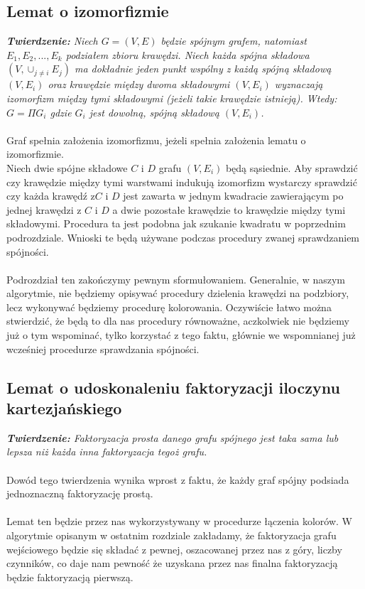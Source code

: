 \documentclass[12pt,a4paper,titlepage]{article}
\begin{document}
\subsection{Lemat o izomorfizmie}
\textit{\textbf{Twierdzenie: }Niech $G=(V, E)$ będzie spójnym grafem, natomiast $E_1 , E_2 , ... , E_k$ podziałem zbioru krawędzi. Niech każda spójna składowa $(V, \cup_{j \neq i}E_j)$ ma dokładnie jeden punkt wspólny z każdą spójną składową $(V, E_i)$ oraz krawędzie między dwoma składowymi $(V, E_i)$ wyznaczają izomorfizm między tymi składowymi (jeżeli takie krawędzie istnieją). Wtedy: $G=\Pi G_i $ gdzie $G_i $ jest dowolną, spójną składową $(V, E_i)$.}\\
\\
Graf spełnia założenia izomorfizmu, jeżeli spełnia założenia lematu o izomorfizmie. \\
Niech dwie spójne składowe $C$ i $D$ grafu $(V, E_i)$ będą sąsiednie. Aby sprawdzić czy krawędzie między tymi warstwami indukują izomorfizm wystarczy sprawdzić czy każda krawędź z$C$ i $D$ jest zawarta w jednym kwadracie zawierającym po jednej krawędzi z $C$ i $D$ a dwie pozostałe krawędzie to krawędzie między tymi składowymi. Procedura ta jest podobna jak szukanie kwadratu w poprzednim podrozdziale. Wnioski te będą używane podczas procedury zwanej sprawdzaniem spójności.\\
\\
Podrozdział ten zakończymy pewnym sformułowaniem. Generalnie, w naszym algorytmie, nie będziemy opisywać procedury dzielenia krawędzi na podzbiory, lecz wykonywać będziemy procedurę kolorowania. Oczywiście łatwo można stwierdzić, że będą to dla nas procedury równoważne, aczkolwiek nie będziemy już o tym wspominać, tylko korzystać z tego faktu, głównie we wspomnianej już wcześniej procedurze sprawdzania spójności.\\ 
\subsection{Lemat o udoskonaleniu faktoryzacji iloczynu kartezjańskiego}
\textit{\textbf{Twierdzenie:} Faktoryzacja prosta danego grafu spójnego jest taka sama lub lepsza niż każda inna faktoryzacja tegoż grafu.}\\
\\
Dowód tego twierdzenia wynika wprost z faktu, że każdy graf spójny podsiada jednoznaczną faktoryzację prostą. \\
\\
Lemat ten będzie przez nas wykorzystywany w procedurze łączenia kolorów. W algorytmie opisanym w ostatnim rozdziale zakładamy, że faktoryzacja grafu wejściowego będzie się składać z pewnej, oszacowanej przez nas z góry, liczby czynników, co daje nam pewność że uzyskana przez nas finalna faktoryzacją będzie faktoryzacją pierwszą.
\newpage
\end{document}
